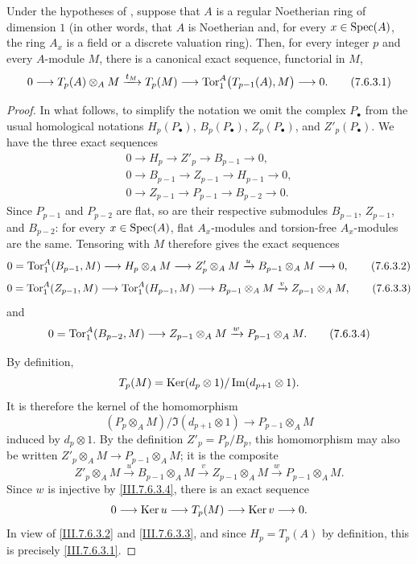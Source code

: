 \begin{proposition}[7.6.3]
\label{III.7.6.3}
Under the hypotheses of , suppose that $A$ is
a regular Noetherian ring of dimension $1$ (in other words,
that $A$ is Noetherian and, for every $x\in\operatorname{Spec}(A)$, the ring
$A_x$ is a field or a discrete valuation ring).  Then, for
every integer $p$ and every $A$-module $M$, there is a
canonical exact sequence, functorial in $M$,
\[
  0
  \longrightarrow T_p(A)\otimes_A M
  \xrightarrow{t_M} T_p(M)
  \longrightarrow
  \operatorname{Tor}_1^A\bigl(T_{p-1}(A),M\bigr)
  \longrightarrow 0.
  \tag{7.6.3.1}\label{III.7.6.3.1}
\]
\end{proposition}

\begin{proof}
In what follows, to simplify the notation we omit the complex
$P_\bullet$ from the usual homological notations
$H_p(P_\bullet)$, $B_p(P_\bullet)$, $Z_p(P_\bullet)$, and
$Z'_p(P_\bullet)$.  We have the three exact sequences
\begin{gather*}
  0\longrightarrow H_p\longrightarrow Z'_p
  \longrightarrow B_{p-1}\longrightarrow 0,\\
  0\longrightarrow B_{p-1}\longrightarrow Z_{p-1}
  \longrightarrow H_{p-1}\longrightarrow 0,\\
  0\longrightarrow Z_{p-1}\longrightarrow P_{p-1}
  \longrightarrow B_{p-2}\longrightarrow 0.
\end{gather*}
Since $P_{p-1}$ and $P_{p-2}$ are flat, so are their
respective submodules $B_{p-1}$, $Z_{p-1}$, and $B_{p-2}$:
for every $x\in\operatorname{Spec}(A)$, flat $A_x$-modules and torsion-free
$A_x$-modules are the same.  Tensoring with $M$ therefore
gives the exact sequences
\[
  0=\operatorname{Tor}_1^A(B_{p-1},M)
  \longrightarrow H_p\otimes_A M
  \longrightarrow Z'_p\otimes_A M
  \xrightarrow{u}B_{p-1}\otimes_A M
  \longrightarrow 0,
  \tag{7.6.3.2}\label{III.7.6.3.2}
\]
\[
  0=\operatorname{Tor}_1^A(Z_{p-1},M)
  \longrightarrow \operatorname{Tor}_1^A(H_{p-1},M)
  \longrightarrow B_{p-1}\otimes_A M
  \xrightarrow{v} Z_{p-1}\otimes_A M,
  \tag{7.6.3.3}\label{III.7.6.3.3}
\]
and
\[
  0=\operatorname{Tor}_1^A(B_{p-2},M)
  \longrightarrow Z_{p-1}\otimes_A M
  \xrightarrow{w}P_{p-1}\otimes_A M.
  \tag{7.6.3.4}\label{III.7.6.3.4}
\]

By definition,
\[
  T_p(M)=
  \operatorname{Ker}(d_p\otimes 1)/\operatorname{Im}(d_{p+1}\otimes 1).
\]
It is therefore the kernel of the homomorphism
\[
  (P_p\otimes_A M)/\Im(d_{p+1}\otimes 1)
  \longrightarrow P_{p-1}\otimes_A M
\]
induced by $d_p\otimes 1$.  By the definition
$Z'_p=P_p/B_p$, this homomorphism may also be written
$Z'_p\otimes_A M\to P_{p-1}\otimes_A M$; it is the composite
\[
  Z'_p\otimes_A M
  \xrightarrow{u}B_{p-1}\otimes_A M
  \xrightarrow{v}Z_{p-1}\otimes_A M
  \xrightarrow{w}P_{p-1}\otimes_A M.
\]
Since $w$ is injective by \eqref{III.7.6.3.4}, there is an
exact sequence
\[
  0\longrightarrow\operatorname{Ker} u\longrightarrow T_p(M)
  \longrightarrow\operatorname{Ker} v\longrightarrow 0.
\]
In view of \eqref{III.7.6.3.2} and
\eqref{III.7.6.3.3}, and since $H_p=T_p(A)$ by definition,
this is precisely \eqref{III.7.6.3.1}.
\end{proof}

